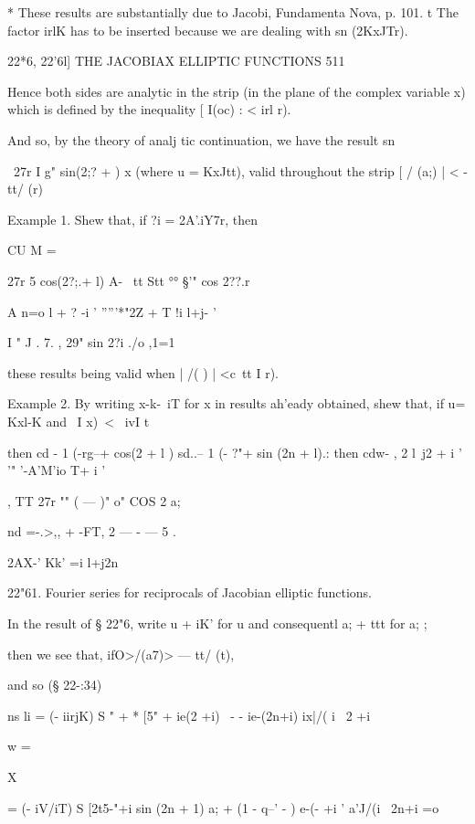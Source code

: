 * These results are substantially due to Jacobi, Fundamenta Nova, p.
101. t The factor irlK has to be inserted because we are dealing with
sn (2KxJTr).



22*6, 22'6l] THE JACOBIAX ELLIPTIC FUNCTIONS 511

Hence both sides are analytic in the strip (in the plane of the
complex variable x) which is defined by the inequality [ I(oc) : < irl
r).



And so, by the theory of analj tic continuation, we have the result sn



\ 27r I g" sin(2;? + ) x (where u = KxJtt), valid throughout the strip
[ / (a;) | < - tt/ (r)



Example 1. Shew that, if ?i = 2A'.iY7r, then

CU M =



27r 5 cos(2?;.+ l) A- \ tt Stt °° §'" cos 2??.r

A n=o l + ? -i ' '''''*"2Z + T !i l+j- '

I " J . 7. , 29" sin 2?i ./o ,1=1 %

these results being valid when | /( ) | <c\ tt I r).

Example 2. By writing x-k-\ iT for x in results ah'eady obtained, shew
that, if u= Kxl-K and \ I x)\ < \ ivI t\

then cd - 1 (-rg--+ cos(2 + l ) sd..-- 1 (- ?"+ sin (2n + l).: then
cdw- , 2 l\ j2 + i ' '" '-A'M'io T+ i '

, TT 27r "" ( — )" o" COS 2 a;

nd =-.>,, + -FT, 2 — - — 5 .

2AX-' Kk' =i l+j2n

22"61. Fourier series for reciprocals of Jacobian elliptic functions.

In the result of § 22"6, write u + iK' for u and consequentl a; + ttt
for a; ;

then we see that, ifO>/(a7)> — tt/ (t),

and so (§ 22-:34)

ns li = (- iirjK) S " + * [5" + ie(2 +i) \ - - ie-(2n+i) ix|/( i \ 2
+i

w =

X

= (- iV/iT) S [2t5-"+i sin (2n + 1) a; + (1 - q--' - ) e-(- +i '
a'J/(i \ 2n+i =o

